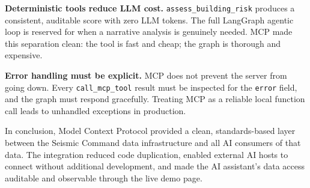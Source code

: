 \documentclass[11pt,a4paper]{article}
\begin{document}
\begin{reflectionbox}
\textbf{Deterministic tools reduce LLM cost.} \texttt{assess\_building\_risk}
produces a consistent, auditable score with zero LLM tokens. The full LangGraph
agentic loop is reserved for when a narrative analysis is genuinely needed. MCP
made this separation clean: the tool is fast and cheap; the graph is thorough and
expensive.
\end{reflectionbox}

\begin{reflectionbox}
\textbf{Error handling must be explicit.} MCP does not prevent the server from
going down. Every \texttt{call\_mcp\_tool} result must be inspected for the
\texttt{error} field, and the graph must respond gracefully. Treating MCP as a
reliable local function call leads to unhandled exceptions in production.
\end{reflectionbox}

\vspace{0.5em}

In conclusion, Model Context Protocol provided a clean, standards-based layer
between the Seismic Command data infrastructure and all AI consumers of that data.
The integration reduced code duplication, enabled external AI hosts to connect
without additional development, and made the AI assistant's data access auditable
and observable through the live demo page.
\end{document}
